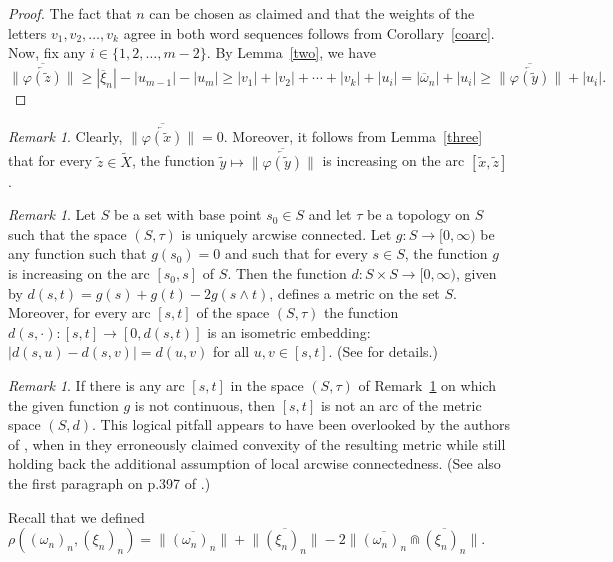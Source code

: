 \documentclass{amsart}
\theoremstyle{definition}
\theoremstyle{remark}
\newtheorem{remark}[theorem]{Remark}
\numberwithin{equation}{section}
\begin{document}
\begin{proof} The fact that $n$ can be chosen as claimed and that the weights of the letters $v_1, v_2, \ldots, v_k$ agree in both word sequences follows from Corollary~\ref{coarc}. Now, fix any $i\in\{1, 2,\dots, m-2\}$. By Lemma~\ref{two}, we have \[\Big\|\overline{\overleftarrow{\varphi(\tilde{z})}}\Big\|\geqslant |\overline{\xi}_n|-|u_{m-1}|-|u_m|\geqslant |v_1|+|v_2|+\cdots +|v_k|+|u_i|= |\overline{\omega}_n|+|u_i|\geqslant \Big\|\overline{\overleftarrow{\varphi(\tilde{y})}}\Big\|+|u_i|.\]
\end{proof}

\begin{remark}\label{increasing}
Clearly, $\Big\|\overline{\overleftarrow{\varphi(\tilde{x})}}\Big\|=0$. Moreover, it follows from Lemma~\ref{three} that for every  $\tilde{z}\in\tilde{X}$, the function $\tilde{y}\mapsto \Big\|\overline{\overleftarrow{\varphi(\tilde{y})}}\Big\|$ is increasing on the arc $[\tilde{x},\tilde{z}]$.
\end{remark}

\begin{remark}\label{ex}
Let $S$ be a set with base point $s_0\in S$ and let $\tau$ be a topology on $S$ such that the space $(S,\tau)$ is uniquely arcwise connected. Let $g:S\rightarrow [0,\infty)$ be any function such that $g(s_0)=0$ and such that for every $s\in S$, the function $g$ is increasing on the arc $[s_0,s]$ of $S$. Then the function $d:S\times S\rightarrow [0,\infty)$, given by $d(s,t)=g(s)+g(t)-2g(s\wedge t)$, defines a metric on the set $S$.  Moreover, for every arc $[s,t]$ of the space $(S,\tau)$ the function $d(s,\cdot):[s,t]\rightarrow [0,d(s,t)]$ is an isometric embedding: $|d(s,u)-d(s,v)|=d(u,v)$ for all $u,v\in [s,t]$. (See \cite[pp.409--411]{MO} for details.)
\end{remark}

\begin{remark} If there is any arc $[s,t]$ in the space $(S,\tau)$ of Remark~\ref{ex} on which the given function $g$ is not continuous, then $[s,t]$ is not an arc of the metric space $(S,d)$. This logical pitfall appears to have been overlooked by the authors of \cite{MO}, when in \cite[Theorem 4.9]{MO} they erroneously claimed convexity of the resulting metric while still holding back the additional assumption of local arcwise connectedness. (See also the first paragraph on p.397 of \cite{MO}.)
\end{remark}

Recall that we defined $\rho((\omega_n)_n,(\xi_n)_n)=\Big\|\overline{(\omega_n)_n}\Big\|+\Big\|\overline{(\xi_n)_n}\Big\|-2\Big\|\overline{(\omega_n)_n}\Cap \overline{(\xi_n)_n}\Big\|$.
\end{document}
